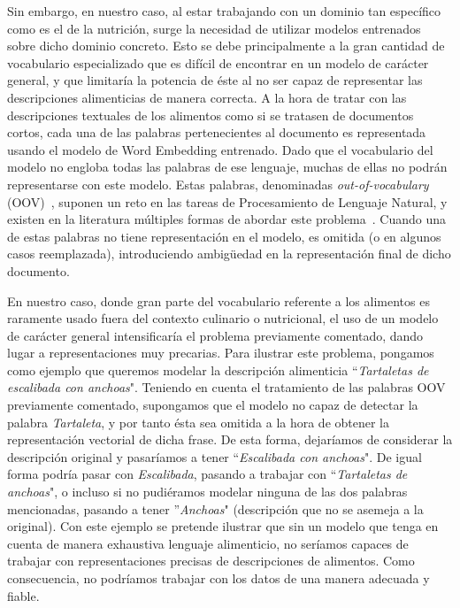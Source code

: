 Sin embargo, en nuestro caso, al estar trabajando con un dominio tan específico como es el de la nutrición, surge la necesidad de utilizar modelos entrenados sobre dicho dominio concreto. Esto se debe principalmente a la gran cantidad de vocabulario especializado que es difícil de encontrar en un modelo de carácter general, y que limitaría la potencia de éste al no ser capaz de representar las descripciones alimenticias de manera correcta. A la hora de tratar con las descripciones textuales de los alimentos como si se tratasen de documentos cortos, cada una de las palabras pertenecientes al documento es representada usando el modelo de Word Embedding entrenado. Dado que el vocabulario del modelo no engloba todas las palabras de ese lenguaje, muchas de ellas no podrán representarse con este modelo. Estas palabras, denominadas \textit{out-of-vocabulary} (OOV)~\cite{8751687}, suponen un reto en las tareas de Procesamiento de Lenguaje Natural, y existen en la literatura múltiples formas de abordar este problema~\cite{camacho2018word}. Cuando una de estas palabras no tiene representación en el modelo, es omitida (o en algunos casos reemplazada), introduciendo ambigüedad en la representación final de dicho documento. 

En nuestro caso, donde gran parte del vocabulario referente a los alimentos es raramente usado fuera del contexto culinario o nutricional, el uso de un modelo de carácter general intensificaría el problema previamente comentado, dando lugar a representaciones muy precarias. Para ilustrar este problema, pongamos como ejemplo que queremos modelar la descripción alimenticia ``\textit{Tartaletas de escalibada con anchoas}". Teniendo en cuenta el tratamiento de las palabras OOV previamente comentado, supongamos que el modelo no capaz de detectar la palabra \textit{Tartaleta}, y por tanto ésta sea omitida a la hora de obtener la representación vectorial de dicha frase. De esta forma, dejaríamos de considerar la descripción original y pasaríamos a tener ``\textit{Escalibada con anchoas}". De igual forma podría pasar con \textit{Escalibada}, pasando a trabajar con ``\textit{Tartaletas de anchoas}", o incluso si no pudiéramos modelar ninguna de las dos palabras mencionadas, pasando a tener ''\textit{Anchoas}" (descripción que no se asemeja a la original). Con este ejemplo se pretende ilustrar que sin un modelo que tenga en cuenta de manera exhaustiva lenguaje alimenticio, no seríamos capaces de trabajar con representaciones precisas de descripciones de alimentos. Como consecuencia, no podríamos trabajar con los datos de una manera adecuada y fiable. 


